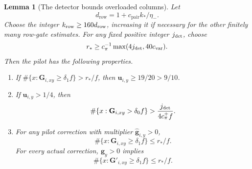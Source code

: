\documentclass[11pt]{article}
\numberwithin{equation}{section}
\newtheorem{lemma}[theorem]{Lemma}
\theoremstyle{definition}
\theoremstyle{remark}
\begin{document}
\begin{lemma}[The detector bounds overloaded columns]
\label{lem:hier-column-test}
Let
\[
 {d}_{\mathrm{row}}=1+{c}_{\mathrm{pair}}k_*/\eta_-.
\]
Choose the integer ${k_{\rm row}}\geq160{d}_{\mathrm{row}}$, increasing it if necessary
for the other finitely many row-gate estimates.  For any fixed positive
integer ${j_{\rm det}}$, choose
\begin{equation}
 {r}_*\geq c_\pi^{-1}\max(4{j_{\rm det}},40{c}_{\mathrm{var}}).
 \label{eq:hier-column-constants}
\end{equation}
Then the pilot has the following properties.
\begin{enumerate}
\item If
$\#\{x:{\mathbf{G}}_{i,xy}\geq\delta_1f\}>{r}_*/f$, then
${\mathbf{u}}_{i,y}\geq19/20>9/10$.
\item If ${\mathbf{u}}_{i,y}>1/4$, then
\[
 \#\{x:{\mathbf{G}}_{i,xy}>\delta_0f\}
       >\frac{{j_{\rm det}}}{4{c_\pi^+} f}.
\]
\item For any pilot correction with multiplier
$\widehat {\mathbf{g}}_{i,y}>0$,
\[
 \#\{x:{\mathbf{G}}_{i,xy}\geq\delta_1f\}\leq {r}_*/f.
\]
For every actual correction, ${\mathbf{g}}_{y}>0$ implies
\[
 \#\{x:{\mathbf{G}}'_{i,xy}\geq\delta_1f\}\leq {r}_*/f.
\]
\end{enumerate}
\end{lemma}
\end{document}
